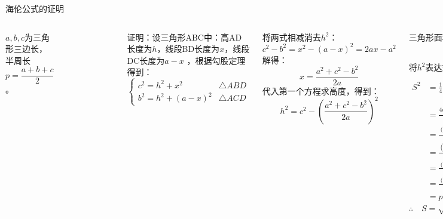 \documentclass{beamer}
\begin{document}
\begin{frame}[t]{海伦公式的证明}
\begin{columns}
$a,b,c$为三角形三边长，半周长 $p = \dfrac{a+b+c}{2}$。
\begin{figure}[htbp]
\centering
{}
\end{figure}

证明：设三角形ABC中：高AD长度为$h$，线段BD长度为$x$，线段DC长度为$a-x$ ，根据勾股定理得到：
$$
\begin{cases}
c^2 = h^2 + x^2 & \text{$\triangle ABD$} \\
b^2 = h^2 + (a-x)^2 & \text{$\triangle ACD$}
\end{cases}
$$

将两式相减消去$h^2$：
$$c^2 - b^2 = x^2 - (a-x)^2 = 2ax - a^2$$
解得：$$x = \frac{a^2 + c^2 - b^2}{2a}$$
代入第一个方程求高度，得到：
$$h^2 = c^2 - \left( \frac{a^2 + c^2 - b^2}{2a} \right)^2$$

三角形面积表达式：
$$S = \frac{1}{2}ah \Rightarrow S^2 = \frac{a^2}{4}h^2$$
将$h^2$表达式代入：
\begin{align*}
S^2 &= \frac{1}{4}a^2 \left[ c^2 - \frac{(a^2 + c^2 - b^2)^2}{4a^2} \right ] \\
&= \frac{4a^2c^2 - (a^2+c^2-b^2)^2}{16}\\
&=\frac{(2ac)^2 - (a^2+c^2-b^2)^2}{16} \\
&=\frac{(2ac+a^2+c^2-b^2)(2ac-a^2-c^2+b^2)}{16}\\
&=\frac{(a+b+c)(a+c-b)(a+b-c)(b+c-a)}{16} \\
&=\frac{(a+b+c)}{2} \cdot \frac{(a+c-b)}{2} \cdot \frac{(a+b-c)}{2} \cdot \frac{(b+c-a)}{2} \\
&=p \cdot (p-a) \cdot (p-b) \cdot (p-c)
\end{align*}
$\therefore \quad S=\sqrt{p\cdot(p-a)\cdot(p-b)\cdot(p-c)}$
\end{columns}
\end{frame}
\end{document}
